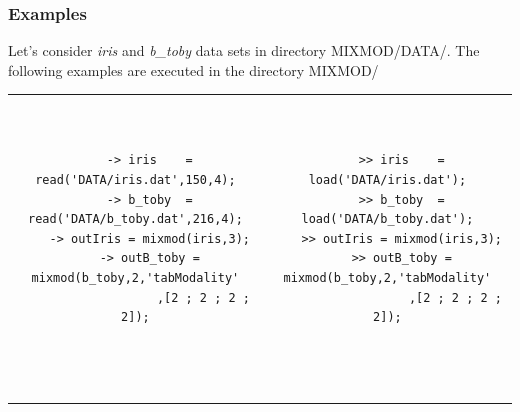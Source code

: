 \subsubsection{Examples}
Let's consider {\it iris} and {\it b\_toby} data sets in directory MIXMOD/DATA/. The following examples are executed in the
directory MIXMOD/\\
\begin{tabular}{c|c}
\begin{minipage}[c]{0.50\columnwidth}%
{\scriptsize
\begin{verbatim}

    -> iris    = read('DATA/iris.dat',150,4);
    -> b_toby  = read('DATA/b_toby.dat',216,4);
    -> outIris = mixmod(iris,3);
    -> outB_toby = mixmod(b_toby,2,'tabModality'
                   ,[2 ; 2 ; 2 ; 2]);



\end{verbatim}}
\end{minipage}%
&
\begin{minipage}[c]{0.50\columnwidth}%
{\scriptsize
\begin{verbatim}


    >> iris    = load('DATA/iris.dat');
    >> b_toby  = load('DATA/b_toby.dat');
    >> outIris = mixmod(iris,3);
    >> outB_toby = mixmod(b_toby,2,'tabModality'
                   ,[2 ; 2 ; 2 ; 2]);




\end{verbatim}}
\end{minipage}%
\end{tabular}

